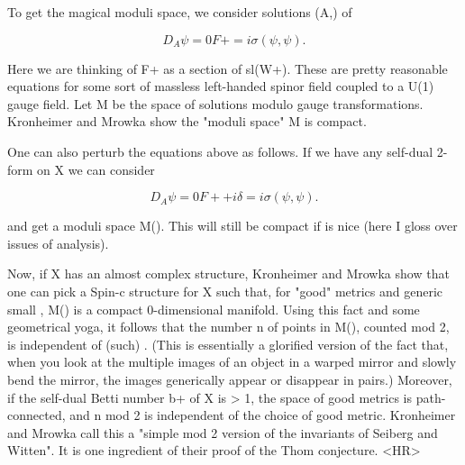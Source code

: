 To get the magical moduli space, we consider solutions (A,\psi ) of

$$
                       D_A \psi  = 0
                       F+ = i \sigma (\psi ,\psi ).
$$
    

Here we are thinking of F+ as a section of sl(W+).  These are pretty
reasonable equations for some sort of massless left-handed spinor field
coupled to a U(1) gauge field.  Let M be the space of solutions modulo
gauge transformations.  Kronheimer and Mrowka show the "moduli space" M
is compact.   

One can also perturb the equations above as follows.  If we have
any self-dual 2-form \delta  on X we can consider

$$
                       D_A \psi  = 0
                       F+ + i \delta  = i \sigma (\psi ,\psi ).
$$
    

and get a moduli space M(\delta ).  This will still be compact if \delta  is
nice (here I gloss over issues of analysis).  

Now, if X has an almost complex structure, Kronheimer and Mrowka show
that one can pick a Spin-c structure for X such that, for "good" metrics
and generic small \delta , M(\delta ) is a compact 0-dimensional manifold.
Using this fact and some geometrical yoga, it follows that the number n of
points in M(\delta ), counted mod 2, is independent of (such) \delta .
(This is essentially a glorified version of the fact that, when you look
at the multiple images of an object in a warped mirror and slowly bend
the mirror, the images generically appear or disappear in pairs.)
Moreover, if the self-dual Betti number b+ of X is > 1, the space of
good metrics is path-connected, and n mod 2 is independent of the choice
of good metric.  Kronheimer and Mrowka call this a "simple mod 2 version
of the invariants of Seiberg and Witten".  It is one ingredient of their
proof of the Thom conjecture.  
<HR>



